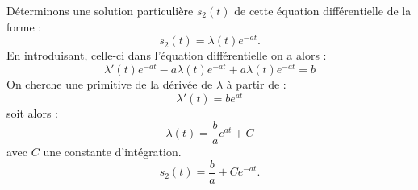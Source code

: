 Déterminons une solution particulière $s_2(t)$ de cette                                                                                   
équation différentielle de la forme :                                                                                                     
$$                                                                                                                                        
s_2(t)=\lambda(t)e^{-at}.                                                                                                                 
$$                                                                                                                                        
En introduisant, celle-ci dans l'équation différentielle on a alors :                                                                     
$$                                                                                                                                        
\lambda'(t)e^{-at}-a\lambda(t)e^{-at}+a\lambda(t)e^{-at}=b                                                                                
$$                                                                                                                                        
On cherche une primitive de la dérivée de $\lambda$ à partir de :                                                                         
$$                                                                                                                                        
\lambda'(t)=be^{at}                                                                                                                       
$$                                                                                                                                        
soit alors :                                                                                                                              
$$                                                                                                                                        
\lambda(t)=\dfrac{b}{a}e^{at}+C                                                                                                           
$$                                                                                                                                        
avec $C$ une constante d'intégration.                                                                                                     
$$                                                                                                                                        
s_2(t)=\dfrac{b}{a}+Ce^{-at}.                                                                                                             
$$                                                                                                                                        
                                                                                                                                          
